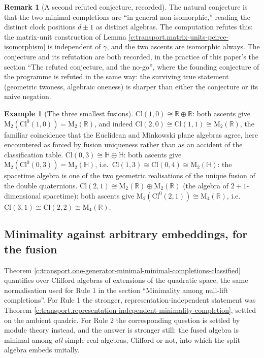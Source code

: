 \documentclass[11pt]{article}
\theoremstyle{definition}
\newtheorem{remark}[theorem]{Remark}
\newtheorem{example}[theorem]{Example}
\theoremstyle{plain}
\providecommand{\Cl}{}\renewcommand{\Cl}{\mathrm{Cl}}
\providecommand{\HH}{}\renewcommand{\HH}{\mathbb{H}}
\providecommand{\Mat}{}\renewcommand{\Mat}{\mathrm{M}}
\providecommand{\R}{}\renewcommand{\R}{\mathbb{R}}
\begin{document}
\begin{remark}[A second refuted conjecture, recorded]\label{c:note.transport.second-refuted-conjecture-recorded}
The natural conjecture is that the two minimal completions are ``in general non-isomorphic,'' reading the distinct clock positions $d \pm 1$ as distinct algebras. The computation refutes this: the matrix-unit construction of Lemma \ref{c:transport.matrix-units-peirce-isomorphism} is independent of $\gamma$, and the two ascents are isomorphic always. The conjecture and its refutation are both recorded, in the practice of this paper's the section ``The refuted conjecture, and the no-go'', where the founding conjecture of the programme is refuted in the same way: the surviving true statement (geometric twoness, algebraic oneness) is sharper than either the conjecture or its naive negation.
\end{remark}

\begin{example}[The three smallest fusions]\label{c:note.transport.three-smallest-fusions}
$\Cl(1,0) \cong \R \oplus \R$: both ascents give $\Mat_2(\Cl^0(1,0)) = \Mat_2(\R)$, and indeed $\Cl(2,0) \cong \Cl(1,1) \cong \Mat_2(\R)$, the familiar coincidence that the Euclidean and Minkowski plane algebras agree, here encountered as forced by fusion uniqueness rather than as an accident of the classification table. $\Cl(0,3) \cong \HH \oplus \HH$: both ascents give $\Mat_2(\Cl^0(0,3)) = \Mat_2(\HH)$, i.e.\ $\Cl(1,3) \cong \Cl(0,4) \cong \Mat_2(\HH)$: the spacetime algebra is one of the two geometric realisations of the unique fusion of the double quaternions. $\Cl(2,1) \cong \Mat_2(\R) \oplus \Mat_2(\R)$ (the algebra of $2{+}1$-dimensional spacetime): both ascents give $\Mat_2(\Cl^0(2,1)) \cong \Mat_4(\R)$, i.e.\ $\Cl(3,1) \cong \Cl(2,2) \cong \Mat_4(\R)$.
\end{example}

\subsection*{Minimality against arbitrary embeddings, for the fusion}
\label{c:note.transport.setting-minimality-against-arbitrary-embeddings-fusion}
Theorem \ref{c:transport.one-generator-minimal-minimal-completions-classified} quantifies over Clifford algebras of extensions of the quadratic space, the same normalisation used for Rule 1 in the section ``Minimality among null-lift completions''. For Rule 1 the stronger, representation-independent statement was Theorem \ref{c:transport.representation-independent-minimality-completion}, settled on the ambient quadric. For Rule 2 the corresponding question is settled by module theory instead, and the answer is stronger still: the fused algebra is minimal among \emph{all} simple real algebras, Clifford or not, into which the split algebra embeds unitally.
\end{document}
